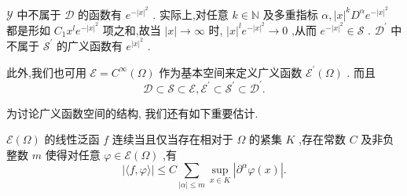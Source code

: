 \documentclass[lang=cn,newtx,10pt,scheme=chinese,thmcnt=chapter]{elegantbook}
\begin{document}
\(\mathcal{Y}\) 中不属于 \(\mathcal{D}\) 的函数有 \({e}^{-{\left| x\right| }^{2}}\) . 实际上,对任意 \(k \in  \mathbb{N}\) 及多重指标 \(\alpha ,{\left| x\right| }^{k}{D}^{\alpha }{e}^{-{\left| x\right| }^{2}}\) 都是形如 \({C}_{1}{x}^{l}{e}^{-{\left| x\right| }^{2}}\) 项之和,故当 \(\left| x\right|  \rightarrow  \infty\) 时, \({\left| x\right| }^{l}{e}^{-{\left| x\right| }^{2}} \rightarrow  0\) ,从而 \({e}^{-{\left| x\right| }^{2}} \in  \mathcal{S}\) . \({\mathcal{D}}^{\prime }\) 中不属于 \({\mathcal{S}}^{\prime }\) 的广义函数有 \({e}^{{\left| x\right| }^{2}}\) .

此外,我们也可用 \(\mathcal{E} = {C}^{\infty }\left( \Omega \right)\) 作为基本空间来定义广义函数 \({\mathcal{E}}^{\prime }\left( \Omega \right)\) . 而且
\begin{equation*}
\mathcal{D} \subset  \mathcal{S} \subset  \mathcal{E},{\mathcal{E}}^{\prime } \subset  {\mathcal{S}}^{\prime } \subset  {\mathcal{D}}^{\prime }.
\end{equation*}

为讨论广义函数空间的结构, 我们还有如下重要估计.
\begin{proposition}
      \(\mathcal{E}\left( \Omega \right)\) 的线性泛函 \(f\) 连续当且仅当存在相对于 \(\Omega\) 的紧集 \(K\) ,存在常数 \(C\) 及非负整数 \(m\) 使得对任意 \(\varphi  \in  \mathcal{E}\left( \Omega \right)\) ,有
\begin{equation}
\left| {\langle f,\varphi \rangle }\right|  \leqslant  C\mathop{\sum }\limits_{{\left| \alpha \right|  \leqslant  m}}\mathop{\sup }\limits_{{x \in  K}}\left| {{\partial }^{\alpha }\varphi \left( x\right) }\right| . 
\end{equation}
\end{proposition}
\end{document}
